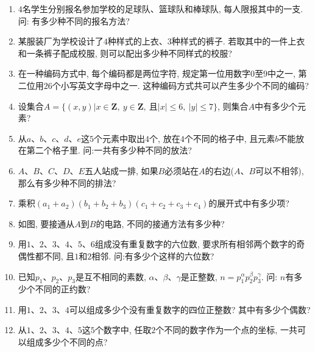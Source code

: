 \documentclass[10pt,a4paper]{article}
\begin{document}
\begin{enumerate}[1.]
\item $4$名学生分别报名参加学校的足球队、篮球队和棒球队, 每人限报其中的一支. 问: 有多少种不同的报名方法? 
\item 某服装厂为学校设计了$4$种样式的上衣、$3$种样式的裤子. 若取其中的一件上衣和一条裤子配成校服, 则可以配出多少种不同样式的校服? 
\item 在一种编码方式中, 每个编码都是两位字符, 规定第一位用数字$0$至$9$中之一, 第二位用$26$个小写英文字母中之一. 这种编码方式共可以产生多少个不同的编码? 
\item 设集合$A=\{(x, y)|x\in \mathbf{Z}, \  y\in \mathbf{Z}, \  \text{且}|x|\le 6, \ |y|\le 7\}$, 则集合$A$中有多少个元素?
\item 从$a$、$b$、$c$、$d$、$e$这$5$个元素中取出$4$个, 放在$4$个不同的格子中, 且元素$b$不能放在第二个格子里. 问:一共有多少种不同的放法?
\item $A$、$B$、$C$、$D$、$E$五人站成一排, 如果$B$必须站在$A$的右边($A$、$B$可以不相邻), 那么有多少种不同的排法?
\item 乘积$(a_1+a_2)(b_1+b_2+b_3)(c_1+c_2+c_3+c_4)$的展开式中有多少项? 
\item 如图, 要接通从$A$到$B$的电路, 不同的接通方法有多少种?
\begin{center}
\end{center}
\item 用$1$、$2$、$3$、$4$、$5$、$6$组成没有重复数字的六位数, 要求所有相邻两个数字的奇偶性都不同, 且$1$和$2$相邻. 问:有多少个这样的六位数? 
\item 已知$p_1$、$p_2$、$p_3$是互不相同的素数, $\alpha$、$\beta$、$\gamma$是正整数, $n=p_1^\alpha p_2^\beta p_3^\gamma$. 问: $n$有多少个不同的正约数?
\item 用$1$、$2$、$3$、$4$可以组成多少个没有重复数字的四位正整数?  其中有多少个偶数? 
\item 从$1$、$2$、$3$、$4$、$5$这$5$个数字中, 任取$2$个不同的数字作为一个点的坐标, 一共可以组成多少个不同的点? 

\end{enumerate}
\end{document}
